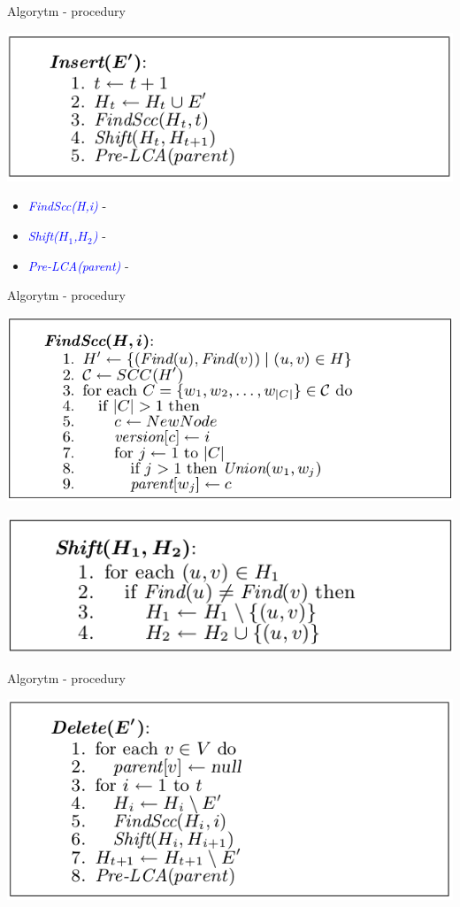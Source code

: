 \documentclass{beamer}
\newcommand{\emp}[1]{\textcolor{blue}{\textit{#1}}}
\begin{document}
\begin{frame}{Algorytm - procedury}
\begin{center}
\includegraphics[scale=0.4]{img/Insert.png}
\end{center}

\begin{itemize}
\item \emp{FindScc(H,i)} - 
\item \emp{Shift($H_1$,$H_2$)} -
\item \emp{Pre-LCA(parent)} - 
\end{itemize}
\end{frame}

\begin{frame}{Algorytm - procedury}
\begin{center}
\includegraphics[scale=0.4]{img/FindScc.png}
\end{center}

\begin{center}
\includegraphics[scale=0.4]{img/Shift.png}
\end{center}
\end{frame}

\begin{frame}{Algorytm - procedury}
\begin{center}
\includegraphics[scale=0.4]{img/Delete.png}
\end{center}
\end{frame}
\end{document}
